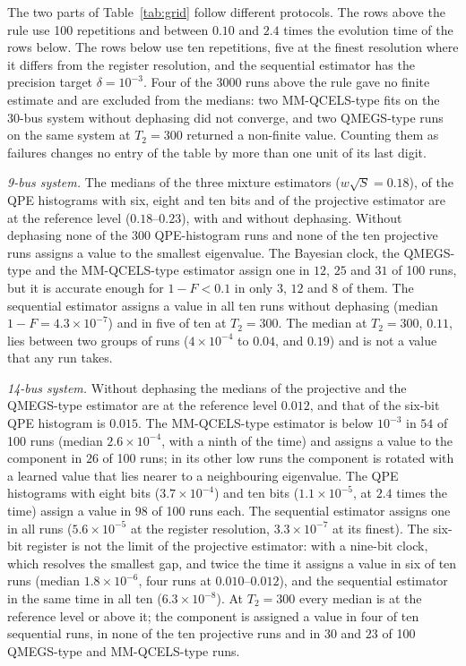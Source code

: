 \documentclass[journal]{IEEEtran}
\begin{document}
The two parts of Table~\ref{tab:grid} follow different protocols. The rows above the rule use 100 repetitions and between $0.10$ and $2.4$ times the evolution time of the rows below. The rows below use ten repetitions, five at the finest resolution where it differs from the register resolution, and the sequential estimator has the precision target $\delta=10^{-3}$. Four of the $3000$ runs above the rule gave no finite estimate and are excluded from the medians: two MM-QCELS-type fits on the 30-bus system without dephasing did not converge, and two QMEGS-type runs on the same system at $T_2=300$ returned a non-finite value. Counting them as failures changes no entry of the table by more than one unit of its last digit.

\emph{9-bus system.} The medians of the three mixture estimators ($w\sqrt S=0.18$), of the QPE histograms with six, eight and ten bits and of the projective estimator are at the reference level ($0.18$--$0.23$), with and without dephasing. Without dephasing none of the $300$ QPE-histogram runs and none of the ten projective runs assigns a value to the smallest eigenvalue. The Bayesian clock, the QMEGS-type and the MM-QCELS-type estimator assign one in $12$, $25$ and $31$ of 100 runs, but it is accurate enough for $1-F<0.1$ in only $3$, $12$ and $8$ of them. The sequential estimator assigns a value in all ten runs without dephasing (median $1-F=4.3\times10^{-7}$) and in five of ten at $T_2=300$. The median at $T_2=300$, $0.11$, lies between two groups of runs ($4\times10^{-4}$ to $0.04$, and $0.19$) and is not a value that any run takes.

\emph{14-bus system.} Without dephasing the medians of the projective and the QMEGS-type estimator are at the reference level $0.012$, and that of the six-bit QPE histogram is $0.015$. The MM-QCELS-type estimator is below $10^{-3}$ in $54$ of 100 runs (median $2.6\times10^{-4}$, with a ninth of the time) and assigns a value to the component in $26$ of 100 runs; in its other low runs the component is rotated with a learned value that lies nearer to a neighbouring eigenvalue. The QPE histograms with eight bits ($3.7\times10^{-4}$) and ten bits ($1.1\times10^{-5}$, at $2.4$ times the time) assign a value in $98$ of 100 runs each. The sequential estimator assigns one in all runs ($5.6\times10^{-5}$ at the register resolution, $3.3\times10^{-7}$ at its finest). The six-bit register is not the limit of the projective estimator: with a nine-bit clock, which resolves the smallest gap, and twice the time it assigns a value in six of ten runs (median $1.8\times10^{-6}$, four runs at $0.010$--$0.012$), and the sequential estimator in the same time in all ten ($6.3\times10^{-8}$). At $T_2=300$ every median is at the reference level or above it; the component is assigned a value in four of ten sequential runs, in none of the ten projective runs and in $30$ and $23$ of 100 QMEGS-type and MM-QCELS-type runs.
\end{document}
